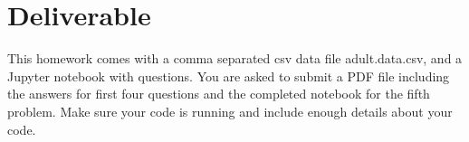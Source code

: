 \documentclass[11pt]{article}
\theoremstyle{quest}
\begin{document}
\section*{Deliverable}
This homework comes with a comma separated csv data file \textsf{adult.data.csv}, and a \textsf{Jupyter} notebook with questions. You are asked to submit a PDF file including the answers for first four questions and the completed notebook for the fifth problem. Make sure your code is running and include enough details about your code.
\end{document}
